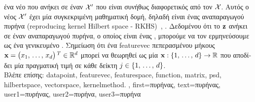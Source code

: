 {{{		ένα νέο}  \foreignlanguage{greek}{που ανήκει σε έναν}  $\mathcal{X}'$ 
		\foreignlanguage{greek}{που είναι συνήθως διαφορετικός από τον $\mathcal{X}$. Αυτός ο νέος}  $\mathcal{X}'$ 
		\foreignlanguage{greek}{έχει μία συγκεκριμένη μαθηματική δομή, δηλαδή είναι ένας}  \foreignlanguage{greek}{αναπαραγωγού 
		πυρήνα} (reproducing kernel Hilbert space - RKHS)~\cite{LampertNowKernel}, \cite{LearningKernelsBook}.
     		\foreignlanguage{greek}{Δεδομένου ότι το ${\bf z}$ ανήκει σε έναν}  \foreignlanguage{greek}{αναπαραγωγού 
		πυρήνα, ο οποίος είναι ένας} , \foreignlanguage{greek}{μπορούμε να τον ερμηνεύσουμε ως ένα γενικευμένο}
	 	. \foreignlanguage{greek}{Σημείωση ότι ένα} \gls{featurevec} \foreignlanguage{greek}{πεπερασμένου μήκους 
		${\bf x}=\big(x_{1}, \,\ldots, \,x_{d} \big)\,^{T} \in \mathbb{R}^{d}$ 
	 	μπορεί να θεωρηθεί ως μία}  ${\bf x}: \{1, \,\ldots, \,d\} \rightarrow \mathbb{R}$ 
	 	\foreignlanguage{greek}{που αποδίδει μία πραγματική τιμή σε κάθε δείκτη} $j \in \{1, \,\ldots, \,d\}$. \\
          	\foreignlanguage{greek}{Βλέπε επίσης:} \gls{datapoint}, \gls{featurevec}, \gls{featurespace}, \gls{function}, \gls{matrix}, \gls{psd}, 
		\gls{hilbertspace}, \gls{vectorspace}, \gls{kernelmethod}. },
	first={\foreignlanguage{greek}{πυρήνας}},
	text={\foreignlanguage{greek}{πυρήνας}},
	user1={\foreignlanguage{greek}{πυρήνας}}, %
  	user2={\foreignlanguage{greek}{πυρήνα}}, %
	user3={\foreignlanguage{greek}{πυρήνα}} %
}

